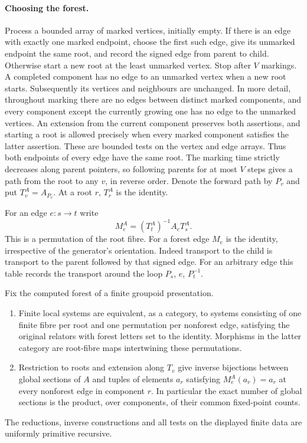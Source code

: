 \paragraph{Choosing the forest.}
Process a bounded array of marked vertices, initially empty. If there is an edge with exactly one marked endpoint, choose the first such edge, give its unmarked endpoint the same root, and record the signed edge from parent to child. Otherwise start a new root at the least unmarked vertex. Stop after $V$ markings. A completed component has no edge to an unmarked vertex when a new root starts. Subsequently its vertices and neighbours are unchanged. In more detail, throughout marking there are no edges between distinct marked components, and every component except the currently growing one has no edge to the unmarked vertices. An extension from the current component preserves both assertions, and starting a root is allowed precisely when every marked component satisfies the latter assertion. These are bounded tests on the vertex and edge arrays. Thus both endpoints of every edge have the same root. The marking time strictly decreases along parent pointers, so following parents for at most $V$ steps gives a path from the root to any $v$, in reverse order. Denote the forward path by $P_v$ and put $T^A_v=A_{P_v}$. At a root $r$, $T^A_r$ is the identity.

For an edge $e:s\to t$ write
\[
             M^A_e=(T^A_t)^{-1} A_e T^A_s .
\]
This is a permutation of the root fibre. For a forest edge $M_e$ is the identity, irrespective of the generator's orientation. Indeed transport to the child is transport to the parent followed by that signed edge. For an arbitrary edge this table records the transport around the loop $P_s$, $e$, $P_t^{-1}$.

\begin{theorem}\label{thm:forest}
Fix the computed forest of a finite groupoid presentation.
\begin{enumerate}
\item Finite local systems are equivalent, as a category, to systems consisting of one finite fibre per root and one permutation per nonforest edge, satisfying the original relators with forest letters set to the identity. Morphisms in the latter category are root-fibre maps intertwining these permutations.
\item Restriction to roots and extension along $T_v$ give inverse bijections between global sections of $A$ and tuples of elements $a_r$ satisfying $M^A_e(a_r)=a_r$ at every nonforest edge in component $r$. In particular the exact number of global sections is the product, over components, of their common fixed-point counts.
\end{enumerate}
The reductions, inverse constructions and all tests on the displayed finite data are uniformly primitive recursive.
\end{theorem}

